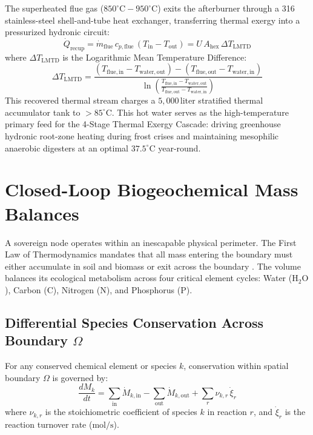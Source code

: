 The superheated flue gas ($850^\circ\mathrm{C} - 950^\circ\mathrm{C}$) exits the afterburner through a 316 stainless-steel shell-and-tube heat exchanger, transferring thermal exergy into a pressurized hydronic circuit:
\begin{equation}
\dot{Q}_{\mathrm{recup}} = \dot{m}_{\mathrm{flue}} \, c_{p,\mathrm{flue}} \, (T_{\mathrm{in}} - T_{\mathrm{out}}) = U \, A_{\mathrm{hex}} \, \Delta T_{\mathrm{LMTD}}
\label{eq:lmtd_hex}
\end{equation}
where $\Delta T_{\mathrm{LMTD}}$ is the Logarithmic Mean Temperature Difference:
\begin{equation}
\Delta T_{\mathrm{LMTD}} = \frac{(T_{\mathrm{flue, in}} - T_{\mathrm{water, out}}) - (T_{\mathrm{flue, out}} - T_{\mathrm{water, in}})}{\ln\left( \frac{T_{\mathrm{flue, in}} - T_{\mathrm{water, out}}}{T_{\mathrm{flue, out}} - T_{\mathrm{water, in}}} \right)}
\label{eq:lmtd_formula}
\end{equation}
This recovered thermal stream charges a $5{,}000\,\mathrm{liter}$ stratified thermal accumulator tank to $>85^\circ\mathrm{C}$. This hot water serves as the high-temperature primary feed for the 4-Stage Thermal Exergy Cascade: driving greenhouse hydronic root-zone heating during frost crises and maintaining mesophilic anaerobic digesters at an optimal $37.5^\circ\mathrm{C}$ year-round.

\section{Closed-Loop Biogeochemical Mass Balances}
\label{sec:biogeochemical_mass_balances}

A sovereign node operates within an inescapable physical perimeter. The First Law of Thermodynamics mandates that all mass entering the boundary must either accumulate in soil and biomass or exit across the boundary \cite{odum1996environmental}. The volume balances its ecological metabolism across four critical element cycles: Water ($\mathrm{H_2O}$), Carbon ($\mathrm{C}$), Nitrogen ($\mathrm{N}$), and Phosphorus ($\mathrm{P}$).

\subsection{Differential Species Conservation Across Boundary \texorpdfstring{$\Omega$}{Omega}}
For any conserved chemical element or species $k$, conservation within spatial boundary $\Omega$ is governed by:
\begin{equation}
\frac{d M_k}{dt} = \sum_{\mathrm{in}} \dot{M}_{k,\mathrm{in}} - \sum_{\mathrm{out}} \dot{M}_{k,\mathrm{out}} + \sum_r \nu_{k,r} \, \dot{\xi}_r
\label{eq:species_mass_conservation}
\end{equation}
where $\nu_{k,r}$ is the stoichiometric coefficient of species $k$ in reaction $r$, and $\dot{\xi}_r$ is the reaction turnover rate ($\mathrm{mol/s}$).

